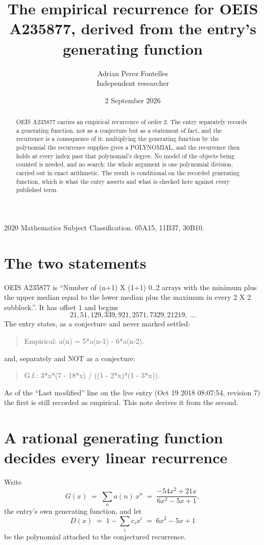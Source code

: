 \documentclass[11pt,a4paper]{article}
\title{The empirical recurrence for OEIS A235877, derived from the entry's generating function}
\author{Adrian Perez Fontelles\\ \small Independent researcher}
\date{2 September 2026}
\theoremstyle{plain}
\theoremstyle{definition}
\begin{document}
\maketitle

\begin{abstract}
OEIS A235877 carries an empirical recurrence of order $2$. The entry separately records a
generating function, not as a conjecture but as a statement of fact, and the recurrence is a
consequence of it: multiplying the generating function by the polynomial the recurrence
supplies gives a POLYNOMIAL, and the recurrence then holds at every index past that
polynomial's degree. No model of the objects being counted is needed, and no search: the
whole argument is one polynomial division, carried out in exact arithmetic. The result is
conditional on the recorded generating function, which is what the entry asserts and what is
checked here against every published term.
\end{abstract}

\noindent\small 2020 Mathematics Subject Classification. 05A15, 11B37, 30B10.\normalsize

\section{The two statements}

OEIS A235877 is ``Number of (n+1) X (1+1) 0..2 arrays with the minimum plus the upper median equal to the lower median plus the maximum in every 2 X 2 subblock.''. It has offset $1$ and begins
\[
21, 51, 129, 339, 921, 2571, 7329, 21219,\ \dots
\]
The entry states, as a conjecture and never marked settled:
\begin{quote}
Empirical: a(n) = 5*a(n-1) - 6*a(n-2).
\end{quote}
and, separately and NOT as a conjecture:
\begin{quote}
G.f.: 3*x*(7 - 18*x) / ((1 - 2*x)*(1 - 3*x)).
\end{quote}
As of the ``Last modified'' line on the live entry (Oct 19 2018 08:07:54, revision 7) the first is still
recorded as empirical. This note derives it from the second.

\section{A rational generating function decides every linear recurrence}

Write
\[
G(x)\;=\;\sum_{n}a(n)\,x^{n}\;=\;\frac{- 54 x^{2} + 21 x}{6 x^{2} - 5 x + 1},
\]
the entry's own generating function, and let
\[
D(x)\;=\;1-\sum_i c_i x^{i}\;=\;6 x^{2} - 5 x + 1
\]
be the polynomial attached to the conjectured recurrence.
\end{document}
